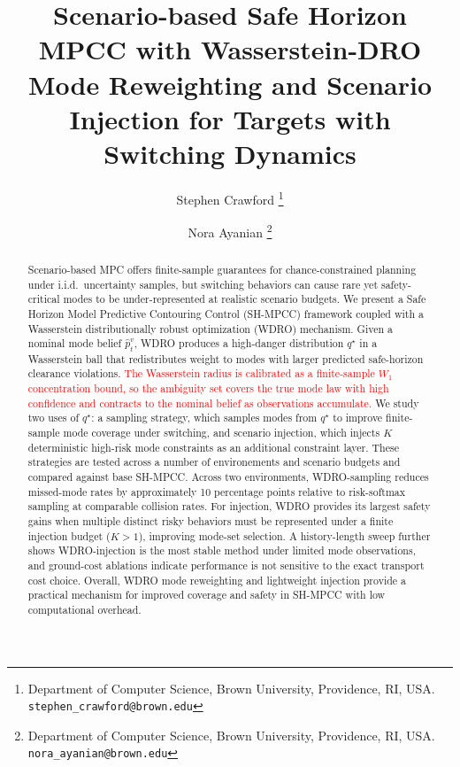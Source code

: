 \documentclass[letterpaper,10pt,conference]{ieeeconf}
\newcommand{\chg}[1]{\textcolor{red}{#1}}
\begin{document}
\title{\LARGE \bf
Scenario-based Safe Horizon MPCC with Wasserstein-DRO Mode Reweighting and Scenario Injection for Targets with Switching Dynamics
}

\author{Stephen Crawford%
\thanks{Department of Computer Science, Brown University, Providence, RI, USA.
{\tt\small stephen\_crawford@brown.edu}}%
\and
Nora Ayanian%
\thanks{Department of Computer Science, Brown University, Providence, RI, USA.
{\tt\small nora\_ayanian@brown.edu}}%
}

\maketitle

\begin{abstract}
Scenario-based MPC offers finite-sample guarantees for chance-constrained planning under i.i.d.\ uncertainty samples, but switching behaviors can cause rare yet safety-critical modes to be under-represented at realistic scenario budgets. We present a Safe Horizon Model Predictive Contouring Control (SH-MPCC) framework coupled with a Wasserstein distributionally robust optimization (WDRO) mechanism. Given a nominal mode belief $\widehat p_t^v$, WDRO produces a high-danger distribution $q^\star$ in a Wasserstein ball that redistributes weight to modes with larger predicted safe-horizon clearance violations. \chg{The Wasserstein radius is calibrated as a finite-sample $W_1$ concentration bound, so the ambiguity set covers the true mode law with high confidence and contracts to the nominal belief as observations accumulate.}
We study two uses of $q^\star$: a sampling strategy, which samples modes from $q^\star$ to improve finite-sample mode coverage under switching, and scenario injection, which injects $K$ deterministic high-risk mode constraints as an additional constraint layer. These strategies are tested across a number of environements and scenario budgets and compared against base SH-MPCC. Across two environments, WDRO-sampling reduces missed-mode rates by approximately 10 percentage points relative to risk-softmax sampling at comparable collision rates. For injection, WDRO provides its largest safety gains when multiple distinct risky behaviors must be represented under a finite injection budget ($K>1$), improving mode-set selection. A history-length sweep further shows WDRO-injection is the most stable method under limited mode observations, and ground-cost ablations indicate performance is not sensitive to the exact transport cost choice. Overall, WDRO mode reweighting and lightweight injection provide a practical mechanism for improved coverage and safety in SH-MPCC with low computational overhead.
\end{abstract}
\end{document}
